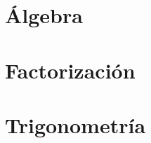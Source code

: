\documentclass[
]{tufte-book}
\begin{document}
\chapter{Álgebra}








\chapter{Factorización}







\chapter{Trigonometría}



%
{}

\end{document}
